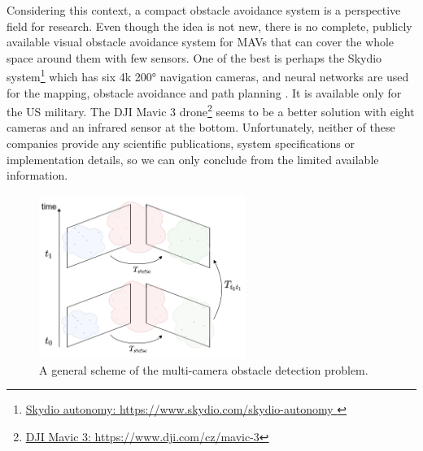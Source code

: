 Considering this context, a compact obstacle avoidance system is a perspective field for research. 
Even though the idea is not new, there is no complete, publicly available visual obstacle avoidance system for MAVs that can cover the whole space around them with few sensors.
One of the best is perhaps the Skydio system\footnote{\href{https://www.skydio.com/skydio-autonomy}{Skydio autonomy: https://www.skydio.com/skydio-autonomy }} which has six 4k \ang{200} navigation cameras, and neural networks are used for the mapping, obstacle avoidance and path planning \cite{Skydio}. 
It is available only for the US military.
The DJI Mavic 3 drone\footnote{\href{https://www.dji.com/cz/mavic-3}{DJI Mavic 3: https://www.dji.com/cz/mavic-3}} seems to be a better solution with eight cameras and an infrared sensor at the bottom.
Unfortunately, neither of these companies provide any scientific publications, system specifications or implementation details, so we can only conclude from the limited available information.

\begin{figure}[t]
    \centering
    \includegraphics[width=0.6\textwidth]{graphics/general_scheme.png}
    \caption{ A general scheme of the multi-camera obstacle detection problem.}
    \label{fig:intro_general}
\end{figure}

